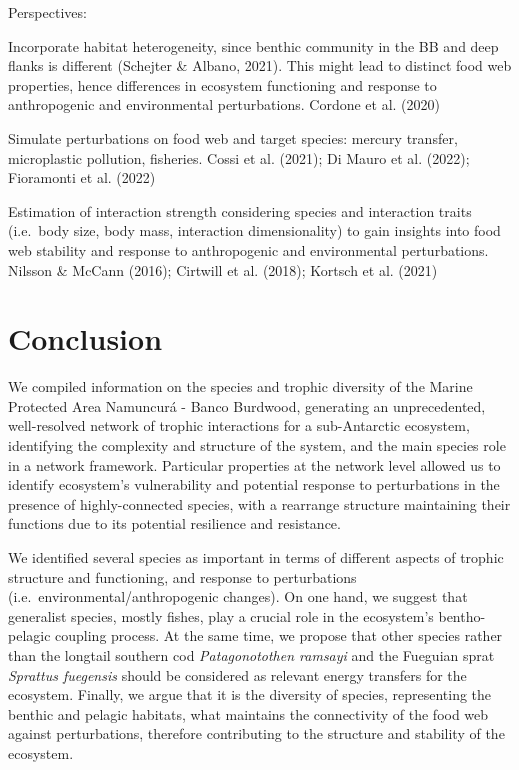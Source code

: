 \documentclass[preprint, 3p,
authoryear]{elsarticle} %
\begin{document}
Perspectives:

Incorporate habitat heterogeneity, since benthic community in the BB and
deep flanks is different (Schejter \& Albano, 2021). This might lead to
distinct food web properties, hence differences in ecosystem functioning
and response to anthropogenic and environmental perturbations. Cordone
et al. (2020)

Simulate perturbations on food web and target species: mercury transfer,
microplastic pollution, fisheries. Cossi et al. (2021); Di Mauro et al.
(2022); Fioramonti et al. (2022)

Estimation of interaction strength considering species and interaction
traits (i.e.~body size, body mass, interaction dimensionality) to gain
insights into food web stability and response to anthropogenic and
environmental perturbations. Nilsson \& McCann (2016); Cirtwill et al.
(2018); Kortsch et al. (2021)

\hypertarget{conclusion}{%
\section{Conclusion}\label{conclusion}}

We compiled information on the species and trophic diversity of the
Marine Protected Area Namuncurá - Banco Burdwood, generating an
unprecedented, well-resolved network of trophic interactions for a
sub-Antarctic ecosystem, identifying the complexity and structure of the
system, and the main species role in a network framework. Particular
properties at the network level allowed us to identify ecosystem's
vulnerability and potential response to perturbations in the presence of
highly-connected species, with a rearrange structure maintaining their
functions due to its potential resilience and resistance.

We identified several species as important in terms of different aspects
of trophic structure and functioning, and response to perturbations
(i.e.~environmental/anthropogenic changes). On one hand, we suggest that
generalist species, mostly fishes, play a crucial role in the
ecosystem's bentho-pelagic coupling process. At the same time, we
propose that other species rather than the longtail southern cod
\emph{Patagonotothen ramsayi} and the Fueguian sprat \emph{Sprattus
fuegensis} should be considered as relevant energy transfers for the
ecosystem. Finally, we argue that it is the diversity of species,
representing the benthic and pelagic habitats, what maintains the
connectivity of the food web against perturbations, therefore
contributing to the structure and stability of the ecosystem.
\end{document}
